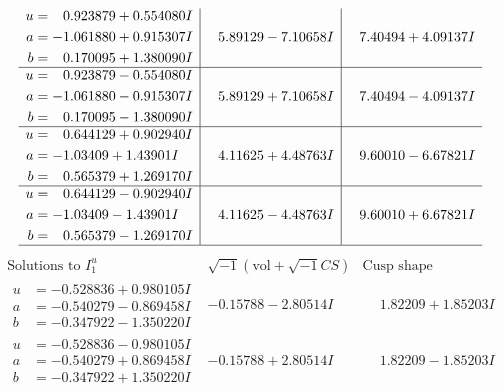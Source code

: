 \documentclass[1p]{elsarticle_modified}
\theoremstyle{definition}
\newcommand{\I}{\sqrt{-1}}
\begin{document}
$$\begin{array}{c|c|c}
\begin{aligned}
u &= \phantom{-}0.923879 + 0.554080 I \\
a &= -1.061880 + 0.915307 I \\
b &= \phantom{-}0.170095 + 1.380090 I\end{aligned}
 & \phantom{-}5.89129 - 7.10658 I & \phantom{-}7.40494 + 4.09137 I \\ \hline\begin{aligned}
u &= \phantom{-}0.923879 - 0.554080 I \\
a &= -1.061880 - 0.915307 I \\
b &= \phantom{-}0.170095 - 1.380090 I\end{aligned}
 & \phantom{-}5.89129 + 7.10658 I & \phantom{-}7.40494 - 4.09137 I \\ \hline\begin{aligned}
u &= \phantom{-}0.644129 + 0.902940 I \\
a &= -1.03409 + 1.43901 I \\
b &= \phantom{-}0.565379 + 1.269170 I\end{aligned}
 & \phantom{-}4.11625 + 4.48763 I & \phantom{-}9.60010 - 6.67821 I \\ \hline\begin{aligned}
u &= \phantom{-}0.644129 - 0.902940 I \\
a &= -1.03409 - 1.43901 I \\
b &= \phantom{-}0.565379 - 1.269170 I\end{aligned}
 & \phantom{-}4.11625 - 4.48763 I & \phantom{-}9.60010 + 6.67821 I\\
 \hline 
 \end{array}$$\newpage$$\begin{array}{c|c|c}  
\text{Solutions to }I^u_{1}& \I (\text{vol} + \sqrt{-1}CS) & \text{Cusp shape}\\
 \hline 
\begin{aligned}
u &= -0.528836 + 0.980105 I \\
a &= -0.540279 - 0.869458 I \\
b &= -0.347922 - 1.350220 I\end{aligned}
 & -0.15788 - 2.80514 I & \phantom{-}1.82209 + 1.85203 I \\ \hline\begin{aligned}
u &= -0.528836 - 0.980105 I \\
a &= -0.540279 + 0.869458 I \\
b &= -0.347922 + 1.350220 I\end{aligned}
 & -0.15788 + 2.80514 I & \phantom{-}1.82209 - 1.85203 I \\ \hline\begin{aligned}

\end{aligned}
\end{array}$$
\end{document}
